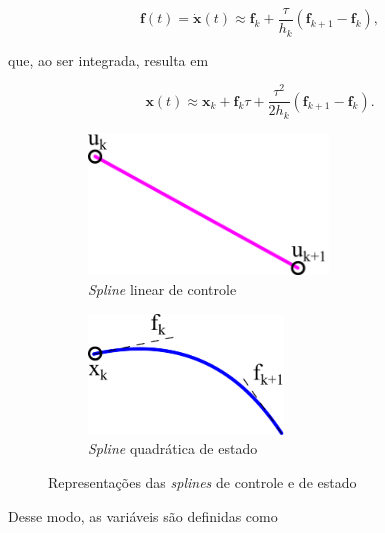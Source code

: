 \begin{equation}
    \mathbf{f}(t) = \dot{\mathbf{x}}(t) \approx \mathbf{f}_k + \dfrac{\tau}{h_k} (\mathbf{f}_{k+1} - \mathbf{f}_k),
\end{equation}

\noindent que, ao ser integrada, resulta em

\begin{equation}
    \mathbf{x}(t) \approx \mathbf{x}_k + \mathbf{f}_k \tau + \dfrac{\tau^2}{2h_k} (\mathbf{f}_{k+1} - \mathbf{f}_k).
\end{equation}

\begin{figure}[H]
    \centering
    \begin{subfigure}{0.48\linewidth}
        \centering
        \includegraphics[width=0.7\textwidth]{Cap2/linear-spline.pdf}
        \caption{\textit{Spline} linear de controle}
    \end{subfigure}
    \hfill
    \begin{subfigure}{0.48\linewidth}
        \centering
        \includegraphics[width=0.57\textwidth]{Cap2/quadratic-spline.pdf}
        \caption{\textit{Spline} quadrática de estado}
    \end{subfigure}
    \caption{Representações das \textit{splines} de controle e de estado}
    \label{fig:splines}
\end{figure}

Desse modo, as variáveis são definidas como

